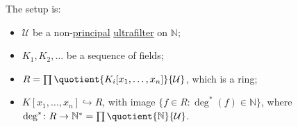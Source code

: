\begin{prev}
	The setup is:
	\begin{itemize}
		\item \(\mathcal{U} \) be a non-\hyperref[eg:principal-filter]{principal} \hyperref[def:ultrafilter]{ultrafilter} on \(\mathbb{N} \);
		\item \(K_1, K_2, \dots \) be a sequence of fields;
		\item \(R = \prod \quotient{K_i[x_1, \dots , x_n]}{\mathcal{U} } \), which is a ring;
		\item \(K[x_1, \dots , x_n] \hookrightarrow R\), with image \(\{ f\in R \colon \deg^{\ast} (f) \in \mathbb{N}\} \), where \(\deg^{\ast} \colon R \to \mathbb{N} ^{\ast} = \prod \quotient{\mathbb{N} }{\mathcal{U} } \).
	\end{itemize}
\end{prev}

